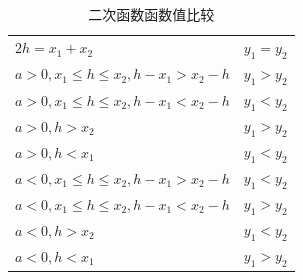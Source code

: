 \begin{table}[H]
    \centering
    \caption{二次函数函数值比较}
    \begin{tabular}{l|l}
        \hline
        \hline
        $2h=x_1+x_2$                          & $y_1=y_2$ \\
        $a>0, x_1 \le h \le x_2, h-x_1>x_2-h$ & $y_1>y_2$ \\
        $a>0, x_1 \le h \le x_2, h-x_1<x_2-h$ & $y_1<y_2$ \\
        $a>0, h > x_2$                        & $y_1>y_2$ \\
        $a>0, h < x_1$                        & $y_1<y_2$ \\
        $a<0, x_1 \le h \le x_2, h-x_1>x_2-h$ & $y_1<y_2$ \\
        $a<0, x_1 \le h \le x_2, h-x_1<x_2-h$ & $y_1>y_2$ \\
        $a<0, h > x_2$                        & $y_1<y_2$ \\
        $a<0, h < x_1$                        & $y_1>y_2$ \\
        \hline
        \hline
    \end{tabular}
\end{table}
\clearpage
